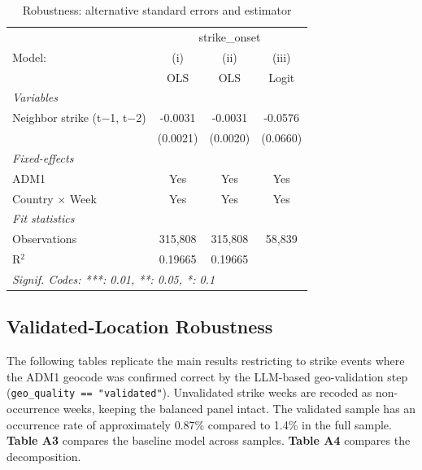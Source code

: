 \documentclass[
  11pt,
]{article}
\begin{document}
\begingroup
\centering
\begin{table}
\caption{Robustness: alternative standard errors and estimator}\tabularnewline

\centering
\begin{tabular}{lccc}
   \hline
    & \multicolumn{3}{c}{strike\_onset}\\
   Model:                         & (i)      & (ii)     & (iii)\\  
                                  &  OLS     & OLS      & Logit\\  
   \midrule
   \emph{Variables}\\
   Neighbor strike (t$-$1, t$-$2) & -0.0031  & -0.0031  & -0.0576\\   
                                  & (0.0021) & (0.0020) & (0.0660)\\   
   \midrule
   \emph{Fixed-effects}\\
   ADM1                           & Yes      & Yes      & Yes\\  
   Country $\times$ Week          & Yes      & Yes      & Yes\\  
   \midrule
   \emph{Fit statistics}\\
   Observations                   & 315,808  & 315,808  & 58,839\\  
   R$^2$                          & 0.19665  & 0.19665  & \\  
   \hline
   \multicolumn{4}{l}{\emph{Signif. Codes: ***: 0.01, **: 0.05, *: 0.1}}\\
\end{tabular}
\end{table}

\par\endgroup

\subsection{Validated-Location
Robustness}\label{validated-location-robustness}

The following tables replicate the main results restricting to strike
events where the ADM1 geocode was confirmed correct by the LLM-based
geo-validation step (\texttt{geo\_quality\ ==\ "validated"}).
Unvalidated strike weeks are recoded as non-occurrence weeks, keeping
the balanced panel intact. The validated sample has an occurrence rate
of approximately 0.87\% compared to 1.4\% in the full sample.
\textbf{Table A3} compares the baseline model across samples.
\textbf{Table A4} compares the decomposition.
\end{document}
